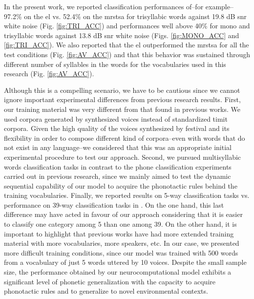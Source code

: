 \documentclass[10pt,letterpaper]{article}
\begin{document}
In the present work, we reported classification performances of--for example--97.2\% on the \gls{el} vs. 52.4\% on the \gls{mrstsa} for trisyllabic words against 19.8 dB \gls{snr} white noise (Fig. \ref{fig:TRI_ACC}) and performances well above 40\% for mono and trisyllabic words against 13.8 dB \gls{snr} white noise (Figs. \ref{fig:MONO_ACC} and \ref{fig:TRI_ACC}). We also reported that the \gls{el} outperformed the \gls{mrstsa} for all the test conditions (Fig. \ref{fig:AV_ACC}) and that this behavior was sustained through different number of syllables in the words for the vocabularies used in this research (Fig. \ref{fig:AV_ACC}).

Although this is a compelling scenario, we have to be cautious since we cannot ignore important experimental differences from previous research results. First, our training material was very different from that found in previous works. We used corpora generated by synthesized voices instead of standardized \gls{timit} corpora.
Given the high quality of the voices synthesized by \gls{festival} \cite{festival2014} and its flexibility in order to compose different kind of corpora--even with words that do not exist in any language--we considered that this was an appropriate initial experimental procedure to test our approach. 
Second, we pursued multisyllabic words classification tasks in contrast to the phone classification experiments carried out in previous research,
since we mainly aimed to test the dynamic sequential capability of our model to acquire the phonotactic rules behind the training vocabularies. 
Finally, we reported results on 5-way classification tasks vs. performance on 39-way classification tasks in \cite{Lee:2009:UFL:2984093.2984217}. 
On the one hand, this last difference may have acted in favour of our approach considering that it is easier to classify one category among 5 than one among 39.
On the other hand, it is important to highlight that previous works have had more extended training material with more vocabularies, more speakers, etc.
In our case, we presented more difficult training conditions, since our model was trained with 500 words from a vocabulary of just 5 words uttered by 10 voices.
Despite the small sample size, the performance obtained by our neurocomputational model exhibits a significant level of phonetic generalization with the capacity to acquire phonotactic rules and to generalize to novel environmental contexts.
\end{document}

